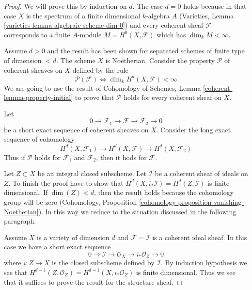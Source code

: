 \begin{proof}
We will prove this by induction on $d$. The case $d = 0$ holds because
in that case $X$ is the spectrum of a finite dimensional $k$-algebra $A$
(Varieties, Lemma \ref{varieties-lemma-algebraic-scheme-dim-0})
and every coherent sheaf $\mathcal{F}$ corresponds to a finite $A$-module
$M = H^0(X, \mathcal{F})$ which has $\dim_k M < \infty$.

\medskip\noindent
Assume $d > 0$ and the result has been shown for separated schemes
of finite type of dimension $< d$. The scheme $X$ is Noetherian. Consider
the property $\mathcal{P}$ of coherent sheaves on $X$ defined by the rule
$$
\mathcal{P}(\mathcal{F}) \Leftrightarrow
\dim_k H^d(X, \mathcal{F}) < \infty
$$
We are going to use the result of
Cohomology of Schemes, Lemma \ref{coherent-lemma-property-initial}
to prove that $\mathcal{P}$ holds for every coherent sheaf on $X$.

\medskip\noindent
Let
$$
0 \to \mathcal{F}_1 \to \mathcal{F} \to \mathcal{F}_2 \to 0
$$
be a short exact sequence of coherent sheaves on $X$.
Consider the long exact sequence of cohomology
$$
H^d(X, \mathcal{F}_1) \to
H^d(X, \mathcal{F}) \to
H^d(X, \mathcal{F}_2)
$$
Thus if $\mathcal{P}$ holds for $\mathcal{F}_1$ and $\mathcal{F}_2$,
then it hods for $\mathcal{F}$.

\medskip\noindent
Let $Z \subset X$ be an integral closed subscheme. Let $\mathcal{I}$
be a coherent sheaf of ideals on $Z$. To finish the proof have to show
that $H^d(X, i_*\mathcal{I}) = H^d(Z, \mathcal{I})$ is finite dimensional.
If $\dim(Z) < d$, then the result holds because the cohomology group
will be zero (Cohomology, Proposition
\ref{cohomology-proposition-vanishing-Noetherian}).
In this way we reduce to the situation discussed in the following paragraph.

\medskip\noindent
Assume $X$ is a variety of dimension $d$ and 
$\mathcal{F} = \mathcal{I}$ is a coherent ideal sheaf. In this
case we have a short exact sequence
$$
0 \to \mathcal{I} \to \mathcal{O}_X \to i_*\mathcal{O}_Z \to 0
$$
where $i : Z \to X$ is the closed subscheme defined by $\mathcal{I}$.
By induction hypothesis we see that
$H^{d - 1}(Z, \mathcal{O}_Z) = H^{d - 1}(X, i_*\mathcal{O}_Z)$ is
finite dimensional. Thus we see that it suffices to prove the result
for the structure sheaf.


\end{proof}
